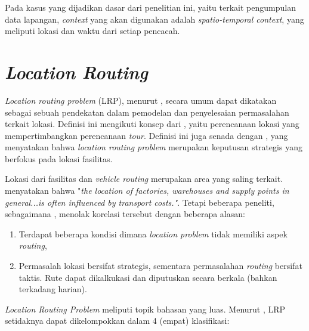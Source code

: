 Pada kasus yang dijadikan dasar dari penelitian ini, yaitu terkait pengumpulan data lapangan, \textit{context} yang akan digunakan adalah \textit{spatio-temporal context}, yang meliputi lokasi dan waktu dari setiap pencacah.


\section{\textit{Location Routing}}
\label{sec:location-routing}
\textit{Location routing problem} (LRP), menurut \citep{nagy_location-routing:_2007}, secara umum dapat dikatakan sebagai sebuah pendekatan dalam pemodelan dan penyelesaian permasalahan terkait lokasi. Definisi ini mengikuti konsep dari \citep{bruns_zweistufige_1998}, yaitu perencanaan lokasi yang mempertimbangkan perencanaan \textit{tour}. Definisi ini juga senada dengan \citep{balakrishnan_integrated_1987}, yang menyatakan bahwa \textit{location routing problem} merupakan keputusan strategis yang berfokus pada lokasi fasilitas.


Lokasi dari fasilitas dan \textit{vehicle routing} merupakan area yang saling terkait. \citep{maranzana_location_1964} menyatakan bahwa "\textit{the location of factories, warehouses and supply points in general...is often influenced by transport costs."}. Tetapi beberapa peneliti, sebagaimana \citep{nagy_location-routing:_2007}, menolak korelasi tersebut dengan beberapa alasan:

\begin{enumerate}
\item Terdapat beberapa kondisi dimana \textit{location problem} tidak memiliki aspek \textit{routing}, 
\item Permasalah lokasi bersifat strategis, sementara permasalahan \textit{routing} bersifat taktis. Rute dapat dikalkukasi dan diputuskan secara berkala (bahkan terkadang harian).
\end{enumerate}


\textit{Location Routing Problem} meliputi topik bahasan yang luas. Menurut \citep{nagy_location-routing:_2007}, LRP setidaknya dapat dikelompokkan dalam 4 (empat) klasifikasi:

